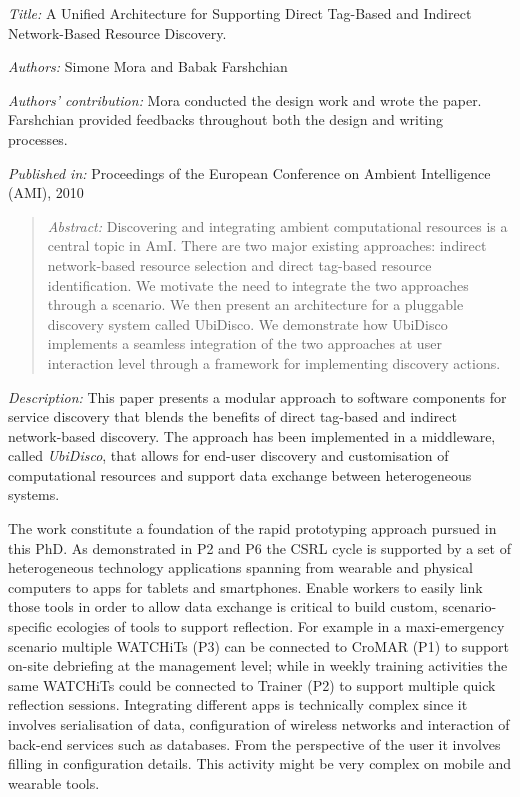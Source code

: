 \emph{Title:} A Unified Architecture for Supporting Direct Tag-Based and
Indirect Network-Based Resource Discovery.

\emph{Authors:} Simone Mora and Babak Farshchian

\emph{Authors' contribution:} Mora conducted the design work and wrote
the paper. Farshchian provided feedbacks throughout both the design and
writing processes.~

\emph{Published in:} Proceedings of the European Conference on Ambient
Intelligence (AMI), 2010

\begin{quote}
\emph{Abstract:} Discovering and integrating ambient computational
resources is a central topic in AmI. There are two major existing
approaches: indirect network-based resource selection and direct
tag-based resource identification. We motivate the need to integrate the
two approaches through a scenario. We then present an architecture for a
pluggable discovery system called UbiDisco. We demonstrate how UbiDisco
implements a seamless integration of the two approaches at user
interaction level through a framework for implementing discovery
actions.
\end{quote}

\emph{Description:} This paper presents a modular approach to software
components for service discovery that blends the benefits of direct
tag-based and indirect network-based discovery. The approach has been
implemented in a middleware, called \emph{UbiDisco}, that allows for
end-user discovery and customisation of computational resources and
support data exchange between heterogeneous systems.

The work constitute a foundation of the rapid prototyping approach
pursued in this PhD. As demonstrated in P2 and P6 the CSRL cycle is
supported by a set of heterogeneous technology applications spanning
from wearable and physical computers to apps for tablets and
smartphones. Enable workers to easily link those tools in order to allow
data exchange is critical to build custom, scenario-specific ecologies
of tools to support reflection. For example in a maxi-emergency scenario
multiple WATCHiTs (P3) can be connected to CroMAR (P1) to support
on-site debriefing at the management level; while in weekly training
activities the same WATCHiTs could be connected to Trainer (P2) to
support multiple quick reflection sessions. Integrating different apps
is technically complex since it involves serialisation of data,
configuration of wireless networks and interaction of back-end services
such as databases. From the perspective of the user it involves filling
in configuration details. This activity might be very complex on mobile
and wearable tools.

